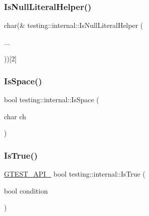 \subsubsection{\texorpdfstring{IsNullLiteralHelper()}{IsNullLiteralHelper()}\hspace{0.1cm}{\footnotesize\ttfamily [2/2]}}
{\footnotesize\ttfamily char(\& testing\+::internal\+::\+Is\+Null\+Literal\+Helper (\begin{DoxyParamCaption}\item[{}]{... }\end{DoxyParamCaption}))\mbox{[}2\mbox{]}}

\mbox{\label{namespacetesting_1_1internal_af429e04f70f9c10f6aa76a5d1ccd389f}} 
\subsubsection{\texorpdfstring{IsSpace()}{IsSpace()}}
{\footnotesize\ttfamily bool testing\+::internal\+::\+Is\+Space (\begin{DoxyParamCaption}\item[{char}]{ch }\end{DoxyParamCaption})\hspace{0.3cm}{\ttfamily [inline]}}

\mbox{\label{namespacetesting_1_1internal_ab2709373c78eb8b1c22a6ba30cceba52}} 
\subsubsection{\texorpdfstring{IsTrue()}{IsTrue()}}
{\footnotesize\ttfamily \mbox{\hyperlink{gtest-port_8h_aa73be6f0ba4a7456180a94904ce17790}{G\+T\+E\+S\+T\+\_\+\+A\+P\+I\+\_\+}} bool testing\+::internal\+::\+Is\+True (\begin{DoxyParamCaption}\item[{bool}]{condition }\end{DoxyParamCaption})}

\mbox{\label{namespacetesting_1_1internal_a84f3baa379fec6bf5947cb5165aa8cc9}} 
